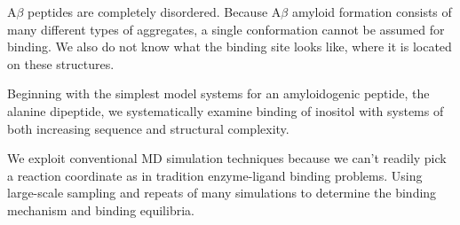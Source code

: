 \1 A$\beta$ peptides are completely disordered.  Because A$\beta$ amyloid formation consists of many different types of aggregates, a single conformation cannot be assumed for binding.  We also do not know what the binding site looks like, where it is located on these structures.

\1 Beginning with the simplest model systems for an amyloidogenic peptide, the alanine dipeptide, we systematically examine binding of inositol with systems of both increasing sequence and structural complexity.

\1 We exploit conventional MD simulation techniques because we can't readily pick a reaction coordinate as in tradition enzyme-ligand binding problems. Using large-scale sampling and repeats of many simulations to determine the binding mechanism and binding equilibria.








% 
% 
% 
% 
% 

